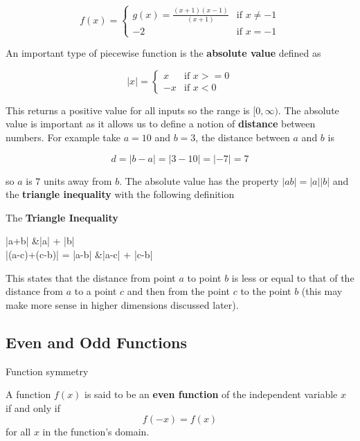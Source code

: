        $$
        f(x) =
        \begin{cases}
            g(x) = \frac{(x+1)(x-1)}{(x+1)} & \text{if } x \neq -1 \\
            -2 & \text{if } x = -1
        \end{cases}
        $$

        An important type of piecewise function is the \textbf{absolute value} defined as

        \begin{equation}
            |x| =
            \begin{cases}
                x & \text{if } x >= 0 \\
                -x & \text{if } x < 0
            \end{cases}
        \end{equation}

        \noindent This returns a positive value for all inputs so the range is $[0,\infty)$. The absolute value is important as it allows us to define a notion of \textbf{distance} between numbers. For example take $a = 10$ and $b = 3$, the distance between $a$ and $b$ is

        \begin{equation}
            d = |b - a| = |3 - 10| = |-7| = 7
        \end{equation}

        \noindent so $a$ is $7$ units away from $b$. The absolute value has the property $|ab| = |a||b|$ and the \textbf{triangle inequality} with the following definition

        \begin{definition}
            The \textbf{Triangle Inequality}

            \begin{aequation}
                |a+b| &\leq |a| + |b| \\
                |(a-c)+(c-b)| = |a-b| &\leq |a-c| + |c-b|
            \end{aequation}
        \end{definition}

        \noindent This states that the distance from point $a$ to point $b$ is less or equal to that of the distance from $a$ to a point $c$ and then from the point $c$ to the point $b$ (this may make more sense in higher dimensions discussed later).

        \subsection{Even and Odd Functions}\label{sect:even and odd functions}
        Function symmetry
        \begin{definition}
            A function $f(x)$ is said to be an \textbf{even function} of the independent variable $x$ if and only if
            $$
            f(-x) = f(x)
            $$
            for all $x$ in the function's domain.
        \end{definition}

